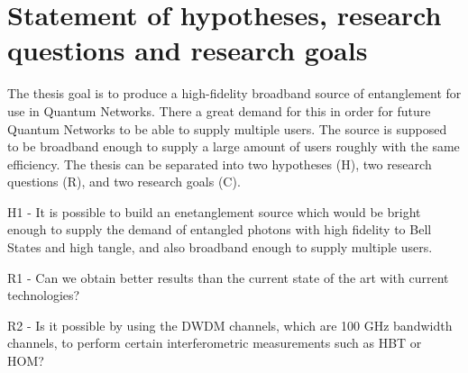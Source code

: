 \documentclass{article}
\theoremstyle{mytheoremstyle}
\theoremstyle{mytheoremstyle}
\theoremstyle{myproblemstyle}
\begin{document}
\section{Statement of hypotheses, research questions and research goals}


The thesis goal is to produce a high-fidelity broadband source of entanglement for use in
Quantum Networks. There a great demand for this in order for future Quantum Networks to be able
to supply multiple users. The source is supposed to be broadband enough to supply a large amount of 
users roughly with the same efficiency.
The thesis can be separated into two hypotheses (H), two research questions (R), and two research goals (C).

H1 - It is possible to build an enetanglement source which would be bright enough to supply the demand of entangled photons with high
fidelity to Bell States and high tangle, and also broadband enough to supply multiple users.


R1 - Can we obtain better results than the current state of the art with current technologies?

R2 - Is it possible by using the DWDM channels, which are 100 GHz bandwidth channels, to perform certain interferometric 
measurements such as HBT or HOM?
\end{document}
